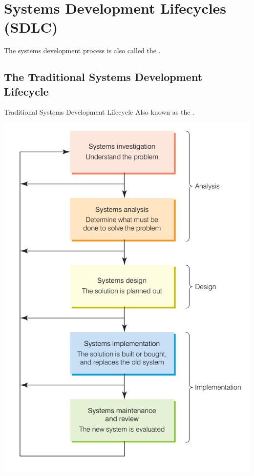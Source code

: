 \documentclass[\main/notes.tex]{subfiles}
\begin{document}
		\pagebreak
		\section{Systems Development Lifecycles (SDLC)}
			The systems development process is also called the .
			\subsection{The Traditional Systems Development Lifecycle}
				\begin{definition}{Traditional Systems Development Lifecycle}
					Also known as the .

					\begin{minipage}[t]{0.44\textwidth}
						\vspace{0pt}
						\begin{center}
							\includegraphics[width=0.95\linewidth]{chapter11/traditional_sdlc.png}

\end{center}
\end{minipage}
\end{definition}
\end{document}
